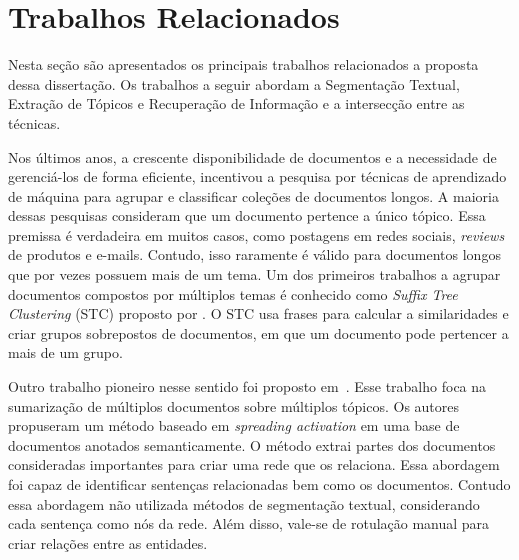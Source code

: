 \section{Trabalhos Relacionados}
\label{sec-trabalhos-relacionados}




Nesta seção são apresentados os principais trabalhos relacionados a proposta dessa dissertação. Os trabalhos a seguir abordam a Segmentação Textual, Extração de Tópicos e Recuperação de Informação e a intersecção entre as técnicas.

Nos últimos anos, a crescente disponibilidade de documentos e a necessidade de gerenciá-los de forma eficiente, incentivou a pesquisa por técnicas de aprendizado de máquina para agrupar e classificar coleções de documentos longos. A maioria dessas pesquisas consideram que um documento pertence a único tópico. Essa premissa é verdadeira em muitos casos, como postagens em redes sociais, \textit{reviews} de produtos e e-mails. 
Contudo, isso raramente é válido para documentos longos que por vezes possuem mais de um tema. 
Um dos primeiros trabalhos a agrupar documentos compostos por múltiplos temas é conhecido como \textit{Suffix Tree Clustering} (STC) proposto por \cite{Zamir1998}. O STC usa frases para calcular a similaridades e criar grupos sobrepostos de documentos, em que um documento pode pertencer a mais de um grupo.

Outro trabalho pioneiro nesse sentido foi proposto em~\cite{Masao:2000}.
Esse trabalho foca na sumarização de múltiplos documentos sobre múltiplos tópicos. Os autores propuseram um método baseado em \textit{spreading activation} em uma base de documentos anotados semanticamente. O método extrai partes dos documentos consideradas importantes para criar uma rede que os relaciona. Essa abordagem foi capaz de identificar sentenças relacionadas bem como os documentos. Contudo essa abordagem não utilizada métodos de segmentação textual, considerando cada sentença como nós da rede. Além disso, vale-se de rotulação manual para criar relações entre as entidades.



